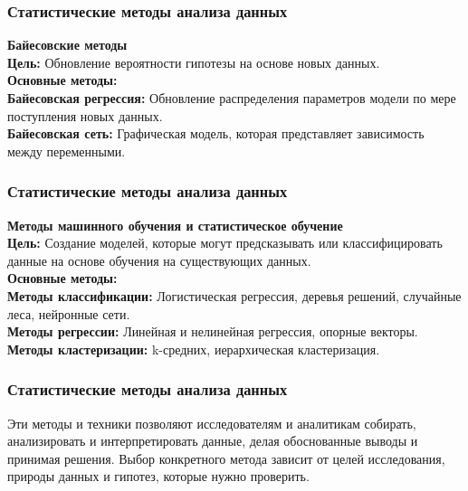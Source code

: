 \documentclass[aspectratio=169]{beamer}
\begin{document}
\begin{frame}
\frametitle{Статистические методы анализа данных}
\textbf{Байесовские методы}
\newline\\
\textbf{Цель:} Обновление вероятности гипотезы на основе новых данных.
\newline\\
\textbf{Основные методы:}
\newline\\
\textbf{Байесовская регрессия:} Обновление распределения параметров модели по мере поступления новых данных.
\newline\\
\textbf{Байесовская сеть:} Графическая модель, которая представляет зависимость между переменными.
\end{frame}

\begin{frame}
\frametitle{Статистические методы анализа данных}
\textbf{Методы машинного обучения и статистическое обучение}
\newline\\
\textbf{Цель:} Создание моделей, которые могут предсказывать или классифицировать данные на основе обучения на существующих данных.
\newline\\
\textbf{Основные методы:}
\newline\\
\textbf{Методы классификации:} Логистическая регрессия, деревья решений, случайные леса, нейронные сети.
\newline\\
\textbf{Методы регрессии:} Линейная и нелинейная регрессия, опорные векторы.
\newline\\
\textbf{Методы кластеризации:} k-средних, иерархическая кластеризация.
\end{frame}

\begin{frame}
\frametitle{Статистические методы анализа данных}
Эти методы и техники позволяют исследователям и аналитикам собирать, анализировать и интерпретировать данные, делая обоснованные выводы и принимая решения. Выбор конкретного метода зависит от целей исследования, природы данных и гипотез, которые нужно проверить.
\end{frame}
\end{document}
